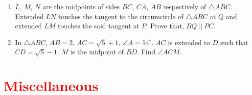 \documentclass[11pt, a4paper]{article}
\begin{document}
\begin{enumerate}
	\item $L$, $M$, $N$ are the midpoints of sides $BC$, $CA$, $AB$ respectively of $\bigtriangleup ABC$. Extended $LN$ touches the tangent to the circumcircle of $\bigtriangleup ABC$ at $Q$ and extended $LM$ touches the said tangent at $P$. Prove that, $BQ \parallel PC$.
	
	\item In $\bigtriangleup ABC$, $AB = 2$, $AC = \sqrt{5} + 1$, $\angle A = 54^{\circ}$. $AC$ is extended to $D$ such that $CD = \sqrt{5} - 1$. $M$ is the midpoint of $BD$. Find $\angle ACM$.
\end{enumerate}
		     
		  
		  
		  
		  
		  
		  
		  
		  
		  
		  
		  
		  
		  
		  
		  
		  
		  
		  
		  
		  
		  
		  
		  
		  
		  
		  
		     

\section{\textcolor{red}{Miscellaneous}}
\end{document}
